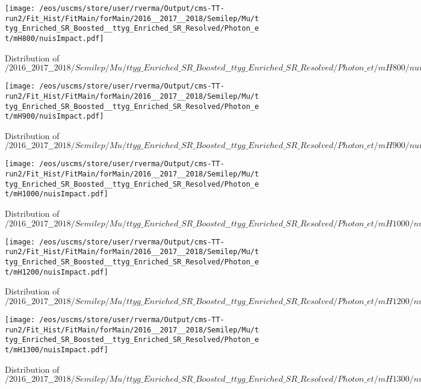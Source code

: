 \begin{figure}
\centering
\texttt{[image: /eos/uscms/store/user/rverma/Output/cms-TT-run2/Fit\_Hist/FitMain/forMain/2016\_\_2017\_\_2018/Semilep/Mu/ttyg\_Enriched\_SR\_Boosted\_\_ttyg\_Enriched\_SR\_Resolved/Photon\_et/mH800/nuisImpact.pdf]}
\caption{Distribution of $/2016\_\_2017\_\_2018/Semilep/Mu/ttyg\_Enriched\_SR\_Boosted\_\_ttyg\_Enriched\_SR\_Resolved/Photon\_et/mH800/nuisImpact.pdf$}
\end{figure}

\begin{figure}
\centering
\texttt{[image: /eos/uscms/store/user/rverma/Output/cms-TT-run2/Fit\_Hist/FitMain/forMain/2016\_\_2017\_\_2018/Semilep/Mu/ttyg\_Enriched\_SR\_Boosted\_\_ttyg\_Enriched\_SR\_Resolved/Photon\_et/mH900/nuisImpact.pdf]}
\caption{Distribution of $/2016\_\_2017\_\_2018/Semilep/Mu/ttyg\_Enriched\_SR\_Boosted\_\_ttyg\_Enriched\_SR\_Resolved/Photon\_et/mH900/nuisImpact.pdf$}
\end{figure}

\begin{figure}
\centering
\texttt{[image: /eos/uscms/store/user/rverma/Output/cms-TT-run2/Fit\_Hist/FitMain/forMain/2016\_\_2017\_\_2018/Semilep/Mu/ttyg\_Enriched\_SR\_Boosted\_\_ttyg\_Enriched\_SR\_Resolved/Photon\_et/mH1000/nuisImpact.pdf]}
\caption{Distribution of $/2016\_\_2017\_\_2018/Semilep/Mu/ttyg\_Enriched\_SR\_Boosted\_\_ttyg\_Enriched\_SR\_Resolved/Photon\_et/mH1000/nuisImpact.pdf$}
\end{figure}

\begin{figure}
\centering
\texttt{[image: /eos/uscms/store/user/rverma/Output/cms-TT-run2/Fit\_Hist/FitMain/forMain/2016\_\_2017\_\_2018/Semilep/Mu/ttyg\_Enriched\_SR\_Boosted\_\_ttyg\_Enriched\_SR\_Resolved/Photon\_et/mH1200/nuisImpact.pdf]}
\caption{Distribution of $/2016\_\_2017\_\_2018/Semilep/Mu/ttyg\_Enriched\_SR\_Boosted\_\_ttyg\_Enriched\_SR\_Resolved/Photon\_et/mH1200/nuisImpact.pdf$}
\end{figure}

\begin{figure}
\centering
\texttt{[image: /eos/uscms/store/user/rverma/Output/cms-TT-run2/Fit\_Hist/FitMain/forMain/2016\_\_2017\_\_2018/Semilep/Mu/ttyg\_Enriched\_SR\_Boosted\_\_ttyg\_Enriched\_SR\_Resolved/Photon\_et/mH1300/nuisImpact.pdf]}
\caption{Distribution of $/2016\_\_2017\_\_2018/Semilep/Mu/ttyg\_Enriched\_SR\_Boosted\_\_ttyg\_Enriched\_SR\_Resolved/Photon\_et/mH1300/nuisImpact.pdf$}
\end{figure}

